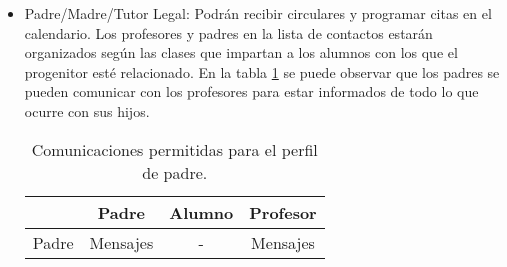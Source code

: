 \begin{itemize}
			\item Padre/Madre/Tutor Legal: Podrán recibir circulares y programar citas en el calendario. Los profesores y padres en la lista de contactos estarán organizados según las clases que impartan a los alumnos con los que el progenitor esté relacionado.
			En la tabla \ref{table:fathersCommunications} se puede observar que los padres se pueden comunicar con los profesores para estar informados de todo lo que ocurre con sus hijos.
			
			\begin{table} [!hbt]
				\begin{center}
					\begin{tabular}{|| c | c | c | c ||}
						\hline
						\hline
						& Padre & Alumno & Profesor \\
						\hline
						Padre & Mensajes & - & Mensajes \\
						\hline
						\hline
					\end{tabular}
					\caption{Comunicaciones permitidas para el perfil de padre.}
					\label{table:fathersCommunications}
				\end{center}
			\end{table}
			
			
		\end{itemize}
